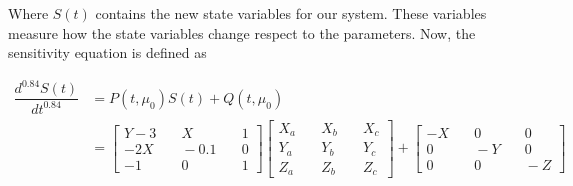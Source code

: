 Where $S(t)$ contains the new state variables for our system. These variables measure how the state variables change respect to the parameters. Now, the sensitivity equation is defined as

\begin{equation}\label{eq:sensitivity}
	\begin{split}
      \dfrac{d^{0.84}S(t)}{dt^{0.84}} &= P(t,\mu_0)S(t) + Q(t,\mu_0)\\
      &=\left[\begin{array}{ccc}
      Y-3 &\quad X 	&\quad 1\\ 
      -2X 	&\quad -0.1 	&\quad 0\\
      -1 		&\quad 0 	&\quad 1
      \end{array}\right]     \left[\begin{array}{ccc}
          X_a&\quad  X_b&\quad X_c\\
          Y_a&\quad  Y_b&\quad Y_c\\
          Z_a&\quad  Z_b&\quad Z_c
      \end{array}\right]+\left[\begin{array}{ccc}
      -X &\quad 0 	&\quad 0\\ 
      0  &\quad -Y 	&\quad 0\\
      0  &\quad 0 	&\quad -Z
      \end{array}\right]
	\end{split}
\end{equation}

